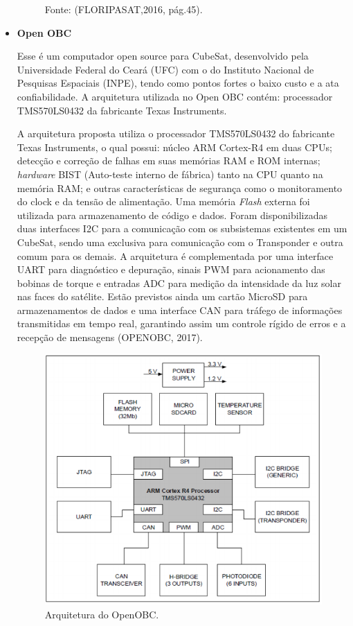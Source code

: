 \begin{itemize}
\begin{figure}[h]
	Fonte: (FLORIPASAT,2016, pág.45).\linebreak
	
	\label{fig12}
\end{figure}

\newpage
\item \textbf{Open OBC}

Esse é um computador open source para CubeSat, desenvolvido pela Universidade Federal do Ceará (UFC) com o do Instituto Nacional de Pesquisas Espaciais (INPE), tendo como pontos fortes o baixo custo e a ata confiabilidade. A arquitetura utilizada no Open OBC  contém: processador TMS570LS0432 da fabricante Texas Instruments.

A arquitetura proposta utiliza o processador TMS570LS0432 do fabricante Texas Instruments, o qual possui: núcleo ARM Cortex-R4 em duas CPUs; detecção e correção de falhas em suas memórias RAM e ROM internas; \textit{hardware} BIST (Auto-teste interno de fábrica) tanto na CPU quanto na memória RAM; e outras características de segurança como o monitoramento do clock e da tensão de alimentação. Uma memória \textit{Flash} externa foi utilizada para armazenamento de código e dados. Foram disponibilizadas duas interfaces I2C para a comunicação com os subsistemas existentes em um CubeSat, sendo uma exclusiva para comunicação com o Transponder e outra comum para os demais. A arquitetura é complementada por uma interface UART para diagnóstico e depuração, sinais PWM para acionamento das bobinas de torque e entradas ADC para medição da intensidade da luz solar nas faces do satélite. Estão previstos ainda um cartão MicroSD para armazenamentos de dados e uma interface CAN para tráfego de informações transmitidas em tempo real, garantindo assim um controle rígido de erros e a recepção de mensagens (OPENOBC, 2017).

\begin{figure}[h]
	\centering
    \caption{Arquitetura do OpenOBC.}
    
	\includegraphics[keepaspectratio=true,scale=0.55]{figuras/openObc.PNG}
	

\end{figure}
\end{itemize}
